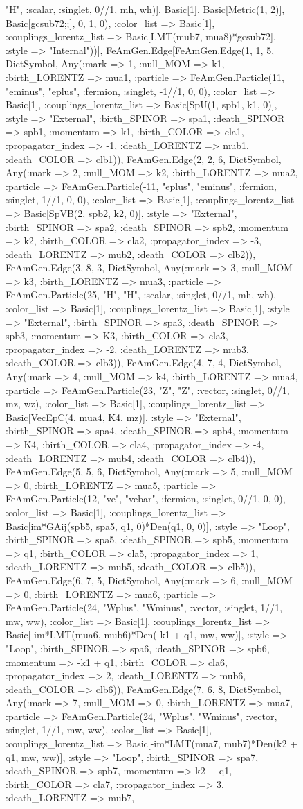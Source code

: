 \documentclass{revtex4}
\begin{document}
\begin{figure}[!htb]
\begin{center}
{"H", :scalar, :singlet, 0//1, mh, wh)], Basic[1], Basic[Metric(1, 2)], Basic[gcsub72;;], 0, 1, 0), :color_list => Basic[1], :couplings_lorentz_list => Basic[LMT(mub7, mua8)*gcsub72], :style => "Internal"))], FeAmGen.Edge[FeAmGen.Edge(1, 1, 5, Dict{Symbol, Any}(:mark => 1, :null_MOM => k1, :birth_LORENTZ => mua1, :particle => FeAmGen.Particle(11, "eminus", "eplus", :fermion, :singlet, -1//1, 0, 0), :color_list => Basic[1], :couplings_lorentz_list => Basic[SpU(1, spb1, k1, 0)], :style => "External", :birth_SPINOR => spa1, :death_SPINOR => spb1, :momentum => k1, :birth_COLOR => cla1, :propagator_index => -1, :death_LORENTZ => mub1, :death_COLOR => clb1)), FeAmGen.Edge(2, 2, 6, Dict{Symbol, Any}(:mark => 2, :null_MOM => k2, :birth_LORENTZ => mua2, :particle => FeAmGen.Particle(-11, "eplus", "eminus", :fermion, :singlet, 1//1, 0, 0), :color_list => Basic[1], :couplings_lorentz_list => Basic[SpVB(2, spb2, k2, 0)], :style => "External", :birth_SPINOR => spa2, :death_SPINOR => spb2, :momentum => k2, :birth_COLOR => cla2, :propagator_index => -3, :death_LORENTZ => mub2, :death_COLOR => clb2)), FeAmGen.Edge(3, 8, 3, Dict{Symbol, Any}(:mark => 3, :null_MOM => k3, :birth_LORENTZ => mua3, :particle => FeAmGen.Particle(25, "H", "H", :scalar, :singlet, 0//1, mh, wh), :color_list => Basic[1], :couplings_lorentz_list => Basic[1], :style => "External", :birth_SPINOR => spa3, :death_SPINOR => spb3, :momentum => K3, :birth_COLOR => cla3, :propagator_index => -2, :death_LORENTZ => mub3, :death_COLOR => clb3)), FeAmGen.Edge(4, 7, 4, Dict{Symbol, Any}(:mark => 4, :null_MOM => k4, :birth_LORENTZ => mua4, :particle => FeAmGen.Particle(23, "Z", "Z", :vector, :singlet, 0//1, mz, wz), :color_list => Basic[1], :couplings_lorentz_list => Basic[VecEpC(4, mua4, K4, mz)], :style => "External", :birth_SPINOR => spa4, :death_SPINOR => spb4, :momentum => K4, :birth_COLOR => cla4, :propagator_index => -4, :death_LORENTZ => mub4, :death_COLOR => clb4)), FeAmGen.Edge(5, 5, 6, Dict{Symbol, Any}(:mark => 5, :null_MOM => 0, :birth_LORENTZ => mua5, :particle => FeAmGen.Particle(12, "ve", "vebar", :fermion, :singlet, 0//1, 0, 0), :color_list => Basic[1], :couplings_lorentz_list => Basic[im*GAij(spb5, spa5, q1, 0)*Den(q1, 0, 0)], :style => "Loop", :birth_SPINOR => spa5, :death_SPINOR => spb5, :momentum => q1, :birth_COLOR => cla5, :propagator_index => 1, :death_LORENTZ => mub5, :death_COLOR => clb5)), FeAmGen.Edge(6, 7, 5, Dict{Symbol, Any}(:mark => 6, :null_MOM => 0, :birth_LORENTZ => mua6, :particle => FeAmGen.Particle(24, "Wplus", "Wminus", :vector, :singlet, 1//1, mw, ww), :color_list => Basic[1], :couplings_lorentz_list => Basic[-im*LMT(mua6, mub6)*Den(-k1 + q1, mw, ww)], :style => "Loop", :birth_SPINOR => spa6, :death_SPINOR => spb6, :momentum => -k1 + q1, :birth_COLOR => cla6, :propagator_index => 2, :death_LORENTZ => mub6, :death_COLOR => clb6)), FeAmGen.Edge(7, 6, 8, Dict{Symbol, Any}(:mark => 7, :null_MOM => 0, :birth_LORENTZ => mua7, :particle => FeAmGen.Particle(24, "Wplus", "Wminus", :vector, :singlet, 1//1, mw, ww), :color_list => Basic[1], :couplings_lorentz_list => Basic[-im*LMT(mua7, mub7)*Den(k2 + q1, mw, ww)], :style => "Loop", :birth_SPINOR => spa7, :death_SPINOR => spb7, :momentum => k2 + q1, :birth_COLOR => cla7, :propagator_index => 3, :death_LORENTZ => mub7, }
\end{center}
\end{figure}
\end{document}
